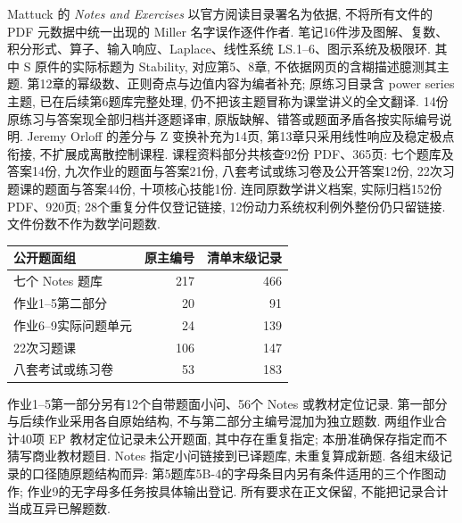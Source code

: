 Mattuck 的 \textit{Notes and Exercises} 以官方阅读目录署名为依据, 不将所有文件的 PDF 元数据中统一出现的 Miller 名字误作逐件作者. 笔记16件涉及图解、复数、积分形式、算子、输入响应、Laplace、线性系统 LS.1--6、图示系统及极限环. 其中 S 原件的实际标题为 Stability, 对应第5、8章, 不依据网页的含糊描述臆测其主题. 第12章的幂级数、正则奇点与边值内容为编者补充; 原练习目录含 power series 主题, 已在后续第6题库完整处理, 仍不把该主题冒称为课堂讲义的全文翻译. 14份原练习与答案现全部归档并逐题译审, 原版缺解、错答或题面矛盾各按实际编号说明. Jeremy Orloff 的差分与 Z 变换补充为14页, 第13章只采用线性响应及稳定极点衔接, 不扩展成离散控制课程.
课程资料部分共核查92份 PDF、365页: 七个题库及答案14份, 九次作业的题面与答案21份, 八套考试或练习卷及公开答案12份, 22次习题课的题面与答案44份, 十项核心技能1份. 连同原数学讲义档案, 实际归档152份 PDF、920页; 28个重复分件仅登记链接, 12份动力系统权利例外整份仍只留链接. 文件份数不作为数学问题数.
\begin{center}
\begin{tabular}{lrr}\toprule 公开题面组 & 原主编号 & 清单末级记录 \\\midrule
七个 Notes 题库 & 217 & 466 \\
作业1--5第二部分 & 20 & 91 \\
作业6--9实际问题单元 & 24 & 139 \\
22次习题课 & 106 & 147 \\
八套考试或练习卷 & 53 & 183 \\\bottomrule
\end{tabular}
\end{center}
作业1--5第一部分另有12个自带题面小问、56个 Notes 或教材定位记录. 第一部分与后续作业采用各自原始结构, 不与第二部分主编号混加为独立题数. 两组作业合计40项 EP 教材定位记录未公开题面, 其中存在重复指定; 本册准确保存指定而不猜写商业教材题目. Notes 指定小问链接到已译题库, 未重复算成新题. 各组末级记录的口径随原题结构而异: 第5题库5B-4的字母条目内另有条件适用的三个作图动作; 作业9的无字母多任务按具体输出登记. 所有要求在正文保留, 不能把记录合计当成互异已解题数.

